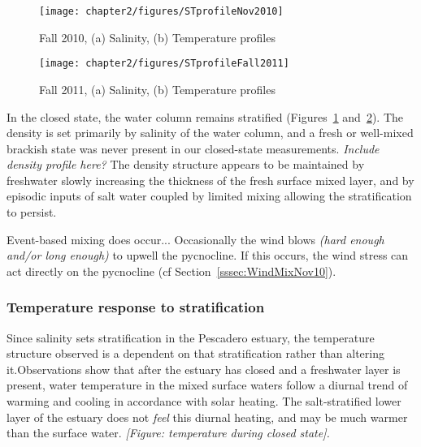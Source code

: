 \begin{figure}[t]
	\centering
	\texttt{[image: chapter2/figures/STprofileNov2010]}
	\caption{Fall 2010, (a) Salinity, (b) Temperature profiles}
	\label{fig:profNov2010}
\end{figure}
\begin{figure}
	\centering
	\texttt{[image: chapter2/figures/STprofileFall2011]}
	\caption{Fall 2011, (a) Salinity, (b) Temperature profiles}
	\label{fig:closed_UVwindsaltb}
\label{fig:profFall2011}
\end{figure}


In the closed state, the water column remains stratified (Figures~\ref{fig:profNov2010} and~\ref{fig:profFall2011}). The density is set primarily by salinity of the water column, and a fresh or well-mixed brackish state was never present in our closed-state measurements. \emph{Include density profile here?} The density structure appears to be maintained by freshwater slowly increasing the thickness of the fresh surface mixed layer, and by episodic inputs of salt water coupled by limited mixing allowing the stratification to persist. 

Event-based mixing does occur...  Occasionally the wind blows \emph{(hard enough and/or long enough)} to upwell the pycnocline. If this occurs, the wind stress can act directly on the pycnocline (cf Section~\ref{sssec:WindMixNov10}).

\subsubsection{Temperature response to stratification} \label{sssec:TempResStrat}

Since salinity sets stratification in the Pescadero estuary, the temperature structure observed is a dependent on that stratification rather than altering it.Observations show that after the estuary has closed and a freshwater layer is present, water temperature in the mixed surface waters follow a diurnal trend of warming and cooling in accordance with solar heating. The salt-stratified lower layer of the estuary does not \emph{feel} this diurnal heating, and may be much warmer than the surface water. \emph{[Figure: temperature during closed state].}

